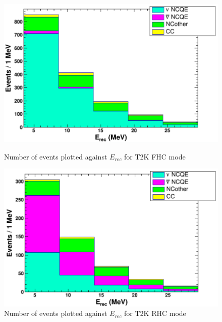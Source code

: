 \begin{figure}
    \centering
    
    \begin{minipage}{0.49\textwidth}
        \centering
        \includegraphics[width=\textwidth]{Figures/erec_2728_POT_FHC.PNG} %
        \caption{Number of events plotted against $E_{rec}$ for T2K FHC mode }
    \end{minipage}\hfill
    \begin{minipage}{0.49\textwidth}
        \centering
        \includegraphics[width=\textwidth]{Figures/erec_2728_POT_RHC.PNG} %
        \caption{Number of events plotted against $E_{rec}$ for T2K RHC mode}
        \label{fig:erec_fhc_rhc_2728}
    \end{minipage}
\end{figure}


